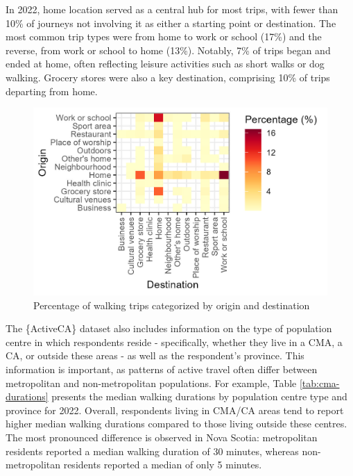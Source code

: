 \documentclass[Royal,times,sageh]{sagej}
\begin{document}
In 2022, home location served as a central hub for most trips, with
fewer than 10\% of journeys not involving it as either a starting point
or destination. The most common trip types were from home to work or
school (17\%) and the reverse, from work or school to home (13\%).
Notably, 7\% of trips began and ended at home, often reflecting leisure
activities such as short walks or dog walking. Grocery stores were also
a key destination, comprising 10\% of trips departing from home.

\begin{figure}

{\centering \includegraphics[width=1\linewidth]{Manuscript-figures/walking_hm_2022} 

}

\caption{Percentage of walking trips categorized by origin and destination}\label{fig:figure-01}
\end{figure}

The \{ActiveCA\} dataset also includes information on the type of
population centre in which respondents reside - specifically, whether
they live in a CMA, a CA, or outside these areas - as well as the
respondent's province. This information is important, as patterns of
active travel often differ between metropolitan and non-metropolitan
populations. For example, Table \ref{tab:cma-durations} presents the
median walking durations by population centre type and province for
2022. Overall, respondents living in CMA/CA areas tend to report higher
median walking durations compared to those living outside these centres.
The most pronounced difference is observed in Nova Scotia: metropolitan
residents reported a median walking duration of 30 minutes, whereas
non-metropolitan residents reported a median of only 5 minutes.
\end{document}
